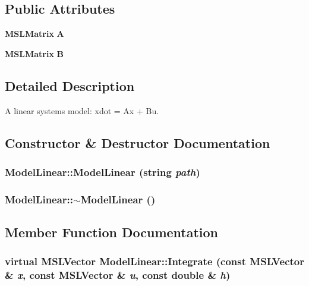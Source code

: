 \subsection*{Public Attributes}
\begin{CompactItemize}
\item 
{\bf MSLMatrix} {\bf A}
\item 
{\bf MSLMatrix} {\bf B}
\end{CompactItemize}


\subsection{Detailed Description}
A linear systems model: xdot = Ax + Bu.



\subsection{Constructor \& Destructor Documentation}
\subsubsection{\setlength{\rightskip}{0pt plus 5cm}Model\-Linear::Model\-Linear (string {\em path})}\label{class_ModelLinear_a0}


\subsubsection{\setlength{\rightskip}{0pt plus 5cm}Model\-Linear::$\sim$Model\-Linear ()\hspace{0.3cm}{\tt  [inline, virtual]}}\label{class_ModelLinear_a1}




\subsection{Member Function Documentation}
\subsubsection{\setlength{\rightskip}{0pt plus 5cm}virtual {\bf MSLVector} Model\-Linear::Integrate (const {\bf MSLVector} \& {\em x}, const {\bf MSLVector} \& {\em u}, const double \& {\em h})\hspace{0.3cm}{\tt  [virtual]}}\label{class_ModelLinear_a3}


